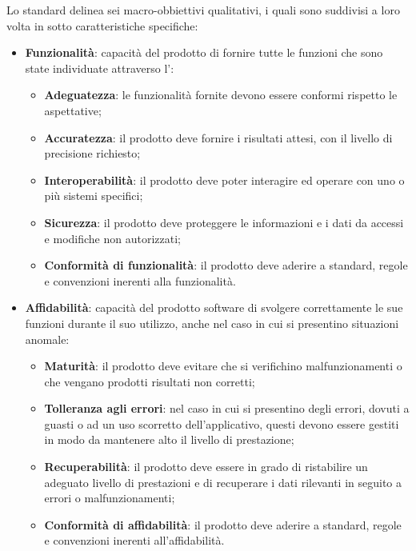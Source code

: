 Lo standard delinea sei macro-obbiettivi qualitativi, i quali sono suddivisi a loro volta in sotto caratteristiche specifiche:
\begin{itemize}
	\item\textbf{Funzionalità}: capacità del prodotto di fornire tutte le funzioni che sono state individuate attraverso l'\AdR:
	\begin{itemize}
		\item\textbf{Adeguatezza}: le funzionalità fornite devono essere conformi rispetto le aspettative;
		\item\textbf{Accuratezza}: il prodotto deve fornire i risultati attesi, con il livello di precisione richiesto;
		\item\textbf{Interoperabilità}: il prodotto deve poter interagire ed operare con uno o più sistemi specifici;
		\item\textbf{Sicurezza}: il prodotto deve proteggere le informazioni e i dati da accessi e modifiche non autorizzati;
		\item\textbf{Conformità di funzionalità}: il prodotto deve aderire a standard, regole e convenzioni inerenti alla funzionalità.
	\end{itemize}

	\item\textbf{Affidabilità}: capacità del prodotto software di svolgere correttamente le sue funzioni durante il suo utilizzo, anche nel caso in cui si presentino situazioni anomale:
	\begin{itemize}
		\item\textbf{Maturità}: il prodotto deve evitare che si verifichino malfunzionamenti o che vengano prodotti risultati non corretti;
		\item\textbf{Tolleranza agli errori}: nel caso in cui si presentino degli errori, dovuti a guasti o ad un uso scorretto dell'applicativo, questi devono essere gestiti in modo da mantenere alto il livello di prestazione;
		\item\textbf{Recuperabilità}: il prodotto deve essere in grado di ristabilire un
adeguato livello di prestazioni e di recuperare i dati rilevanti in seguito a errori o malfunzionamenti;
		\item\textbf{Conformità di affidabilità}: il prodotto deve aderire a standard, regole e convenzioni inerenti all'affidabilità.
	\end{itemize}


\end{itemize}
